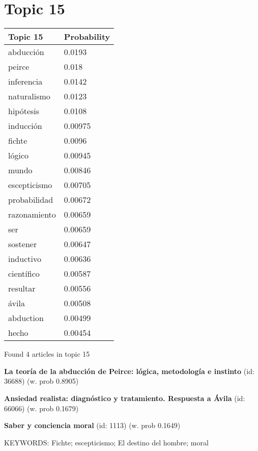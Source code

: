 \documentclass{article}
\begin{document}
\vfill
\newpage


\centering
\thispagestyle{empty}
\section*{Topic 15}\vfill
\begin{tabular}{ll}
\toprule
     Topic 15 & Probability \\
\midrule
    abducción &      0.0193 \\
       peirce &       0.018 \\
   inferencia &      0.0142 \\
  naturalismo &      0.0123 \\
    hipótesis &      0.0108 \\
    inducción &     0.00975 \\
       fichte &      0.0096 \\
       lógico &     0.00945 \\
        mundo &     0.00846 \\
 escepticismo &     0.00705 \\
 probabilidad &     0.00672 \\
 razonamiento &     0.00659 \\
          ser &     0.00659 \\
     sostener &     0.00647 \\
    inductivo &     0.00636 \\
   científico &     0.00587 \\
     resultar &     0.00556 \\
        ávila &     0.00508 \\
    abduction &     0.00499 \\
        hecho &     0.00454 \\
\bottomrule
\end{tabular}

\vfill
Found 4 articles in topic 15
\vfill

\textbf{La teoría de la abducción de Peirce: lógica, metodología e instinto} (id: 36688)
 (w. prob 0.8905)
\vfill

\textbf{Ansiedad realista: diagnóstico y tratamiento. Respuesta a Ávila} (id: 66066)
 (w. prob 0.1679)
\vfill

\textbf{Saber y conciencia moral} (id: 1113)
 (w. prob 0.1649)


KEYWORDS:
Fichte; escepticismo; El destino del hombre; moral

\vfill
\newpage
\end{document}
